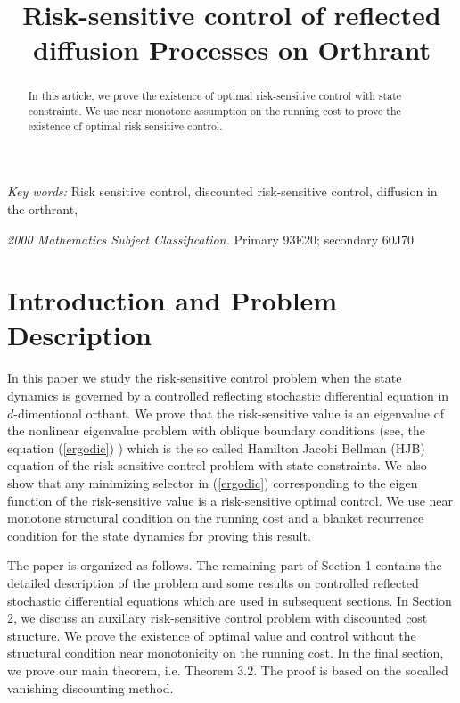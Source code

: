 \documentclass[11pt]{amsart}
\title[Risk-sensitive control of reflected diffusion Process]
{Risk-sensitive control of reflected diffusion Processes on Orthrant}
\numberwithin{equation}{section}
\begin{document}
\maketitle

\begin{abstract}
\noindent In this article, we prove the existence of optimal risk-sensitive control with state
constraints. 
We use near monotone assumption  on the running cost to
prove the existence of optimal  risk-sensitive control.
\end{abstract}


\vspace{10mm}

\noindent
 {\it Key words:} Risk sensitive control, discounted risk-sensitive control, 
diffusion in the orthrant,

\vspace{5mm}
\noindent
{\it 2000 Mathematics Subject Classification.} Primary 93E20; secondary 60J70






\section{Introduction and Problem Description}\label{PD}
\setcounter{equation}{0}
In this paper we study the risk-sensitive control problem when the state dynamics 
is governed by a controlled reflecting stochastic differential equation in $d$-dimentional orthant. 
We prove that the risk-sensitive value is an eigenvalue of the nonlinear eigenvalue problem with oblique
boundary conditions (see, the equation 
(\ref{ergodic}) ) which is the so called Hamilton Jacobi Bellman (HJB) equation of the risk-sensitive 
control problem with state constraints. We also show that any minimizing selector in 
(\ref{ergodic})   
corresponding to the eigen function of the risk-sensitive value is a risk-sensitive optimal control.  
We use near monotone 
structural condition on the running cost and a blanket recurrence condition for the state dynamics
for proving this result.


The paper is organized as follows. The remaining part of Section 1 contains the 
detailed description of the problem and some results on controlled reflected stochastic differential
equations which are used in  subsequent sections. In Section 2, we discuss an auxillary risk-sensitive
control problem with discounted cost structure. We prove the existence of optimal value and 
control without the structural condition near monotonicity on the running cost. In the  final section,
we prove our main theorem, i.e. Theorem 3.2. The proof is based on the socalled vanishing 
discounting method. 
\end{document}
